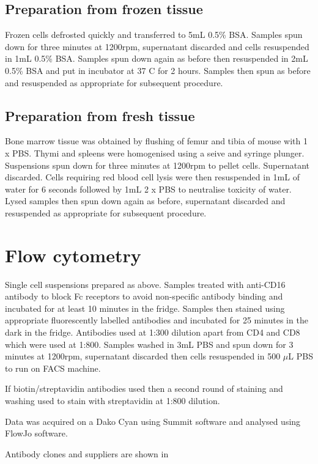 \subsection{Preparation from frozen tissue}

Frozen cells defrosted quickly and transferred to 5mL 0.5\% BSA.
Samples spun down for three minutes at 1200rpm, supernatant discarded and cells resuspended in 1mL 0.5\% BSA.
Samples spun down again as before then resuspended in 2mL 0.5\% BSA and put in incubator at 37 \textdegree C for 2 hours.
Samples then spun as before and resuspended as appropriate for subsequent procedure.

\subsection{Preparation from fresh tissue}
Bone marrow tissue was obtained by flushing of femur and tibia of mouse with 1 x PBS.
Thymi and spleens were homogenised using a seive and syringe plunger.
Suspensions spun down for three minutes at 1200rpm to pellet cells.
Supernatant discarded.
Cells requiring red blood cell lysis were then resuspended in 1mL of water for 6 seconds followed by 1mL 2 x PBS to neutralise toxicity of water.
Lysed samples then spun down again as before, supernatant discarded and resuspended as appropriate for subsequent procedure.

\section{Flow cytometry}

Single cell suspensions prepared as above.
Samples treated with anti-CD16 antibody to block Fc receptors to avoid non-specific antibody binding and incubated for at least 10 minutes in the fridge.
Samples then stained using appropriate fluorescently labelled antibodies and incubated for 25 minutes in the dark in the fridge.
Antibodies used at 1:300 dilution apart from CD4 and CD8 which were used at 1:800. 
Samples washed in 3mL PBS and spun down for 3 minutes at 1200rpm, supernatant discarded then cells resuspended in 500 $\mu$L PBS to run on FACS machine.

If biotin/streptavidin antibodies used then a second round of staining and washing used to stain with streptavidin at 1:800 dilution.

Data was acquired on a Dako Cyan using Summit software and analysed using FlowJo software.

Antibody clones and suppliers are shown in 

